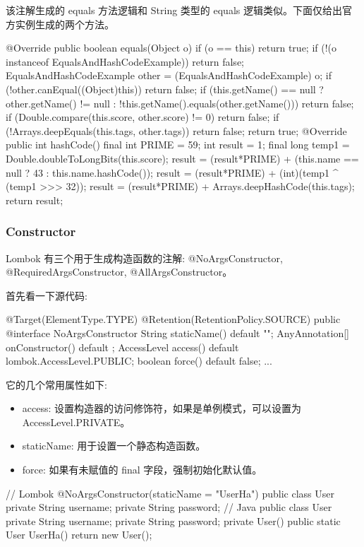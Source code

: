 该注解生成的 equals 方法逻辑和 String 类型的 equals 逻辑类似。下面仅给出官方实例生成的两个方法。

\begin{Java}
@Override public boolean equals(Object o) {
    if (o == this) return true;
    if (!(o instanceof EqualsAndHashCodeExample)) return false;
    EqualsAndHashCodeExample other = (EqualsAndHashCodeExample) o;
    if (!other.canEqual((Object)this)) return false;
    if (this.getName() == null ? other.getName() != null : !this.getName().equals(other.getName())) return false;
    if (Double.compare(this.score, other.score) != 0) return false;
    if (!Arrays.deepEquals(this.tags, other.tags)) return false;
    return true;
}  
@Override public int hashCode() {
    final int PRIME = 59;
    int result = 1;
    final long temp1 = Double.doubleToLongBits(this.score);
    result = (result*PRIME) + (this.name == null ? 43 : this.name.hashCode());
    result = (result*PRIME) + (int)(temp1 ^ (temp1 >>> 32));
    result = (result*PRIME) + Arrays.deepHashCode(this.tags);
    return result;
}
\end{Java}

\subsubsection{Constructor}

Lombok 有三个用于生成构造函数的注解: @NoArgsConstructor, @RequiredArgsConstructor, @AllArgsConstructor。

首先看一下源代码:

\begin{Java}
@Target(ElementType.TYPE)
@Retention(RetentionPolicy.SOURCE)
public @interface NoArgsConstructor {
    String staticName() default "";
    AnyAnnotation[] onConstructor() default {};
	AccessLevel access() default lombok.AccessLevel.PUBLIC;
	boolean force() default false;
    ...
}
\end{Java}

它的几个常用属性如下:
\begin{itemize}
    \item access: 设置构造器的访问修饰符，如果是单例模式，可以设置为 AccessLevel.PRIVATE。
    \item staticName: 用于设置一个静态构造函数。
    \item force: 如果有未赋值的 final 字段，强制初始化默认值。
\end{itemize}

\begin{Java}
// Lombok
@NoArgsConstructor(staticName = "UserHa")
public class User {
    private String username;
    private String password;
}
// Java
public class User {
    private String username;
    private String password;
    private User() { }
    public static User UserHa() {
        return new User();
    }
}
\end{Java}

